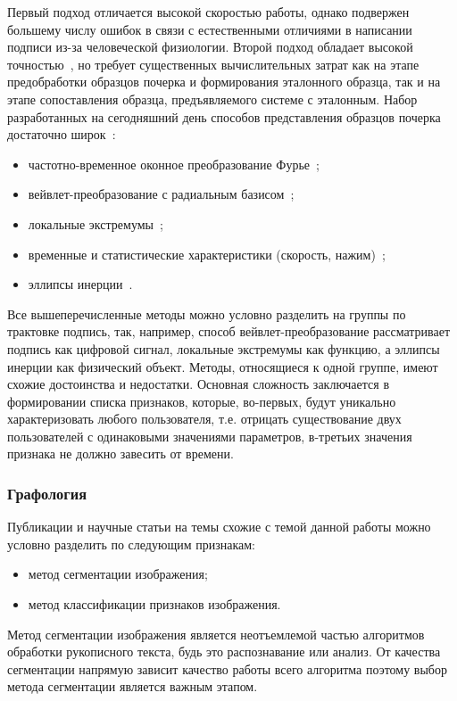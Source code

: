 Первый подход отличается высокой скоростью работы, однако подвержен большему числу ошибок в связи с естественными отличиями в написании подписи из-за человеческой физиологии.
Второй подход обладает высокой точностью~\cite{nelson_kishon}, но требует существенных вычислительных затрат как на этапе предобработки образцов почерка и формирования эталонного образца, так и на этапе сопоставления образца, предъявляемого системе с эталонным.
Набор разработанных на сегодняшний день способов представления образцов почерка достаточно широк~\cite{ivanov_korparate_network}:
\begin{itemize}
  \item частотно-временное оконное преобразование Фурье~\cite{vorona, nalwa, koliadin};
  \item вейвлет-преобразование с радиальным базисом~\cite{leus, anisimova};
  \item локальные экстремумы~\cite{nalwa, zhu_yang_zhu};
  \item временные и статистические характеристики (скорость, нажим)~\cite{bryxomickii, hao_chan, ruchai, doroshenko_koctychenko, lognicov};
  \item эллипсы инерции~\cite{nalwa}.
\end{itemize}

Все вышеперечисленные методы можно условно разделить на группы по трактовке подпись, так, например, способ вейвлет-преобразование рассматривает подпись как цифровой сигнал, локальные экстремумы как функцию, а эллипсы инерции как физический объект. Методы, относящиеся к одной группе, имеют схожие достоинства и недостатки.
Основная сложность заключается в формировании списка признаков, которые, во-первых, будут уникально характеризовать любого пользователя, т.е. отрицать существование двух пользователей с одинаковыми значениями параметров, в-третьих значения признака не должно завесить от времени.

\subsubsection{Графология}
Публикации и научные статьи на темы схожие с темой данной работы можно условно разделить по следующим признакам:
\begin{itemize}
  \item метод сегментации изображения;
  \item метод классификации признаков изображения.
\end{itemize}

Метод сегментации изображения является неотъемлемой частью алгоритмов обработки рукописного текста, будь это распознавание или анализ. От качества сегментации напрямую зависит качество работы всего алгоритма поэтому выбор метода сегментации является важным этапом.

